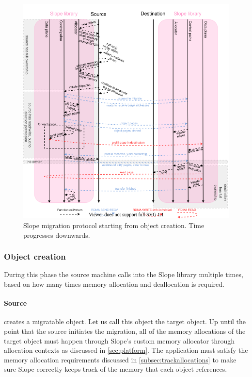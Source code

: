 \begin{figure}[t]
\centering

\includegraphics[width=1\textwidth]{migration-protocol.drawio}
\caption{
    Slope migration protocol starting from object creation. Time progresses
    downwards.
}
\label{fig:migrationprotocol}
\end{figure}

\subsubsection{Object creation}
During this phase the source machine calls into the Slope library multiple
times, based on how many times memory allocation and deallocation is required.

\paragraph{Source} creates a migratable object. Let us call this object
the target object. Up until the point that
the source initiates the migration, all of the memory allocations of the target object
must happen through
Slope's custom memory allocator through allocation contexts as discussed in
 \autoref{sec:platform}.
The application must satisfy the memory allocation requirements discussed in
\autoref{subsec:trackallocations} to make sure Slope correctly keeps track of the
memory that each object references. 

